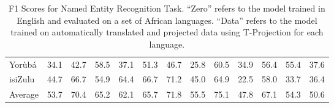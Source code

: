 \begin{table}[htb]
{\begin{tabular}{@{}l|cc|cc|cc|cc|cc|cc@{}}
            Yorùbá               & 34.1         & 42.7            & 58.5                         & 37.1          & 51.3      & 46.7                         & 25.8      & \cellcolor[HTML]{B7E1CD}60.5 & 34.9                & 56.4                   & 55.4           & 37.6              \\
            isiZulu              & 44.7         & 66.7            & 54.9                         & 64.4          & 66.7      & \cellcolor[HTML]{B7E1CD}71.2 & 45.0      & 64.9                         & 22.5                & 58.0                   & 33.7           & 36.4              \\ \midrule
            Average              & 53.7         & 70.4            & 65.2                         & 62.1          & 65.7      & 71.8                         & 55.5      & \cellcolor[HTML]{B7E1CD}75.1 & 47.8                & 67.1                   & 54.3           & 50.6              \\ \bottomrule
            \end{tabular}
    }
    \caption{F1 Scores for Named Entity Recognition Task. ``Zero'' refers to the model trained in English and evaluated on a set of African languages. ``Data'' refers to the model trained on automatically translated and projected data using T-Projection for each language.}
    \label{tab6:modelvsdata}
    \end{table}